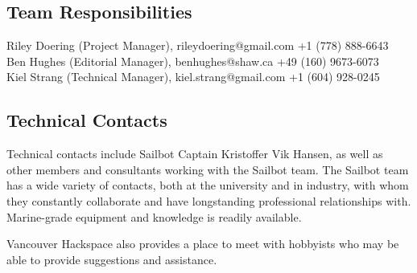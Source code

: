 \subsection{\label{sec:responsabilities:team}Team Responsibilities}
Riley Doering (Project Manager), rileydoering@gmail.com +1 (778) 888-6643\\
Ben Hughes (Editorial Manager), benhughes@shaw.ca +49 (160) 9673-6073\\
Kiel Strang (Technical Manager), kiel.strang@gmail.com +1 (604) 928-0245\\

\subsection{\label{sec:responsabilities:technical-contacts}Technical Contacts}
Technical contacts include Sailbot Captain Kristoffer Vik Hansen, as well as other members and consultants working with the Sailbot team. The Sailbot team has a wide variety of contacts, both at the university and in industry, with whom they constantly collaborate and have longstanding professional relationships with. Marine-grade equipment and knowledge is readily available.

Vancouver Hackspace also provides a place to meet with hobbyists who may be able to provide suggestions and assistance.

